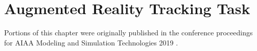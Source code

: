 \chapter{Augmented Reality Tracking Task}
\label{chap:3dtracking}





% 

Portions of this chapter were originally published in the conference proceedings for AIAA Modeling and Simulation Technologies 2019 \citep{karasinski_evaluating_2019}.

